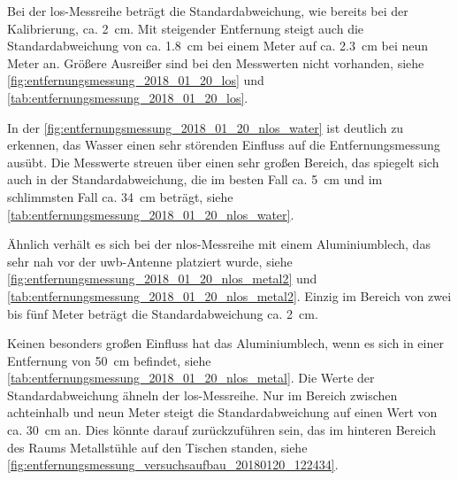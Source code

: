 Bei der \Gls{los}-Messreihe beträgt die Standardabweichung, wie bereits bei der Kalibrierung, ca. \SI{2}{\centi\meter}. Mit steigender Entfernung steigt auch die Standardabweichung von ca. \SI{1.8}{\centi\meter} bei einem Meter auf ca. \SI{2.3}{\centi\meter} bei neun Meter an. Größere Ausreißer sind bei den Messwerten nicht vorhanden, siehe \autoref{fig:entfernungsmessung_2018_01_20_los} und \autoref{tab:entfernungsmessung_2018_01_20_los}.

In der \autoref{fig:entfernungsmessung_2018_01_20_nlos_water} ist deutlich zu erkennen, das Wasser einen sehr störenden Einfluss auf die Entfernungsmessung ausübt. Die Messwerte streuen über einen sehr großen Bereich, das spiegelt sich auch in der Standardabweichung, die im besten Fall ca. \SI{5}{\centi\meter} und im schlimmsten Fall ca. \SI{34}{\centi\meter} beträgt, siehe \autoref{tab:entfernungsmessung_2018_01_20_nlos_water}.

Ähnlich verhält es sich bei der \Gls{nlos}-Messreihe mit einem Aluminiumblech, das sehr nah vor der \Gls{uwb}-Antenne platziert wurde, siehe \autoref{fig:entfernungsmessung_2018_01_20_nlos_metal2} und \autoref{tab:entfernungsmessung_2018_01_20_nlos_metal2}. Einzig im Bereich von zwei bis fünf Meter beträgt die Standardabweichung ca. \SI{2}{\centi\meter}.

Keinen besonders großen Einfluss hat das Aluminiumblech, wenn es sich in einer Entfernung von \SI{50}{\centi\meter} befindet, siehe \autoref{tab:entfernungsmessung_2018_01_20_nlos_metal}. Die Werte der Standardabweichung ähneln der \Gls{los}-Messreihe. Nur im Bereich zwischen achteinhalb und neun Meter steigt die Standardabweichung auf einen Wert von ca. \SI{30}{\centi\meter} an. Dies könnte darauf zurückzuführen sein, das im hinteren Bereich des Raums Metallstühle auf den Tischen standen, siehe \autoref{fig:entfernungsmessung_versuchsaufbau_20180120_122434}.


